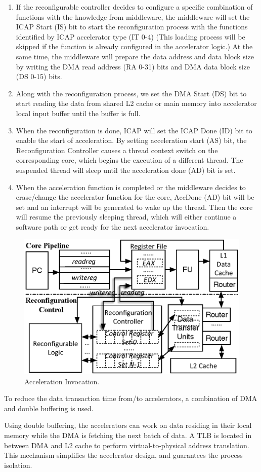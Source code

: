 \begin{enumerate}
\item If the reconfigurable controller decides to configure a specific
  combination of functions with the knowledge from middleware, the
  middleware will set the ICAP Start (IS) bit to start the
  reconfiguration process with the functions identified by ICAP
  accelerator type (IT 0-4) (This loading process will be skipped if
  the function is already configured in the accelerator logic.) At the
  same time, the middleware will prepare the data address and data
  block size by writing the DMA read address (RA 0-31) bits and DMA
  data block size (DS 0-15) bits.

\item Along with the reconfiguration process, we set the DMA Start
  (DS) bit to start reading the data from shared L2 cache or main
  memory into accelerator local input buffer until the buffer is full.

\item When the reconfiguration is done, ICAP will set the ICAP Done
  (ID) bit to enable the start of acceleration. By setting
  acceleration start (AS) bit, the Reconfiguration Controller causes a
  thread context switch on the corresponding core, which begins the
  execution of a different thread. The suspended thread will sleep
  until the acceleration done (AD) bit is set.

\item When the acceleration function is completed or the middleware
  decides to erase/change the accelerator function for the core,
  AccDone (AD) bit will be set and an interrupt will be generated to
  wake up the thread. Then the core will resume the previously
  sleeping thread, which will either continue a software path or get
  ready for the next accelerator invocation.
\end{enumerate}


\begin{figure}
    \centering
    \includegraphics[width=4.0 in]{HPCA14-Acceleration_Invocation}
    \caption{Acceleration Invocation.}
    \label{fig_Acc_Invoc}
\end{figure}


To reduce the data transaction time from/to accelerators, a
combination of DMA and double buffering is used. 

Using double buffering, the accelerators can work on data residing in
their local memory while the DMA is fetching the next batch of data. A
TLB is located in between DMA and L2 cache to perform
virtual-to-physical address translation. This mechanism simplifies the
accelerator design, and guarantees the process isolation.

